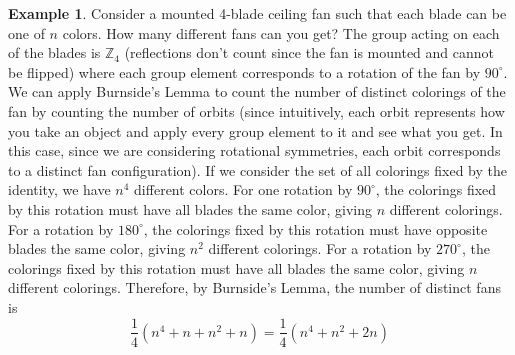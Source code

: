 \documentclass{article}
\newcommand{\Z}{\mathbb{Z}}
\theoremstyle{definition}
\newtheorem{example}[theorem]{Example}
\begin{document}
\begin{example}
    Consider a mounted 4-blade ceiling fan such that each blade can be one of $n$ colors. How many different fans can you get? The group acting on each of the blades is $\Z_4$ (reflections don't count since the fan is mounted and cannot be flipped) where each group element corresponds to a rotation of the fan by $90^\circ$. We can apply Burnside's Lemma to count the number of distinct colorings of the fan by counting the number of orbits (since intuitively, each orbit represents how you take an object and apply every group element to it and see what you get. In this case, since we are considering rotational symmetries, each orbit corresponds to a distinct fan configuration). If we consider the set of all colorings fixed by the identity, we have $n^4$ different colors. For one rotation by $90^\circ$, the colorings fixed by this rotation must have all blades the same color, giving $n$ different colorings. For a rotation by $180^\circ$, the colorings fixed by this rotation must have opposite blades the same color, giving $n^2$ different colorings. For a rotation by $270^\circ$, the colorings fixed by this rotation must have all blades the same color, giving $n$ different colorings. Therefore, by Burnside's Lemma, the number of distinct fans is 
    \begin{equation*}
        \frac{1}{4} (n^4 + n + n^2 + n) = \frac{1}{4} (n^4 + n^2 + 2n)
    \end{equation*}
\end{example}
\end{document}

